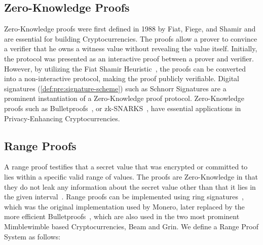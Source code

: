 \subsection{Zero-Knowledge Proofs} \label{sec:pre:privacy:zeroknowlegde}

Zero-Knowledge proofs were first defined in 1988 by Fiat, Fiege, and Shamir and are essential for building Cryptocurrencies.
The proofs allow a prover to convince a verifier that he owns a witness value without revealing the value itself.
Initially, the protocol was presented as an interactive proof between a prover and verifier.
However, by utilizing the Fiat Shamir Heuristic~\cite{feige1988zero}, the proofs can be converted into a non-interactive protocol, making the proof publicly verifiable.
Digital signatures (\cref{def:pre:signature-scheme}) such as Schnorr Signatures are a prominent instantiation of a Zero-Knowledge proof protocol.
Zero-Knowledge proofs such as Bulletproofs~\cite{bunz2018bulletproofs}, or zk-SNARKS~\cite{bitansky2012extractable}, have essential applications in Privacy-Enhancing Cryptocurrencies.


\subsection{Range Proofs} \label{sec:pre:rangeproof}

A range proof testifies that a secret value that was encrypted or committed to lies within a specific valid range of values.
The proofs are Zero-Knowledge in that they do not leak any information about the secret value other than that it lies in the given interval~\cite{bunz2018bulletproofs}.
Range proofs can be implemented using ring signatures~\cite{noether2016ring}, which was the original implementation used by Monero, later replaced by the more efficient Bulletproofs~\cite{bunz2018bulletproofs}, which are also used in the two most prominent Mimblewimble based Cryptocurrencies, Beam and Grin.
We define a Range Proof System as follows:

